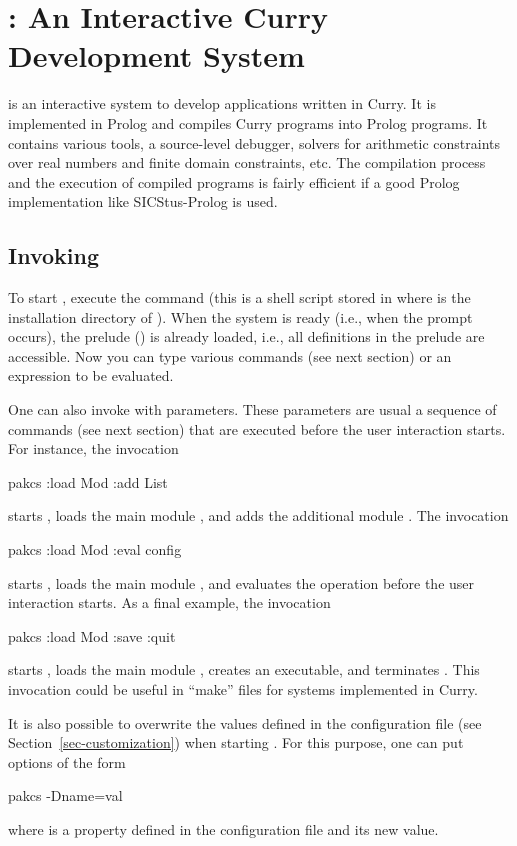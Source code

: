\section{\CYS: An Interactive Curry Development System}
\label{sec-curry2prolog}

\CYS\index{\CYS} is an interactive system to develop applications
written in Curry.
It is implemented in Prolog and compiles
Curry programs into Prolog programs. It contains various tools,
a source-level debugger,
solvers for arithmetic constraints over real numbers
and finite domain constraints, etc. The compilation process and the
execution of compiled programs is fairly efficient
if a good Prolog implementation like SICStus-Prolog is used.


\subsection{Invoking \CYS}
\label{sec:invoke-kics2}

To start \CYS, execute the command 
(this is a shell script stored in
 where \cyshome is the installation directory
of \CYS).
When the system is ready (i.e., when the prompt  occurs),
the prelude ()
is already loaded, i.e., all definitions in the prelude are accessible.
Now you can type various commands (see next section)
or an expression to be evaluated.

One can also invoke \CYS with parameters.
These parameters are usual a sequence of commands
(see next section) that are executed before the user interaction
starts. For instance, the invocation
\begin{curry}
pakcs :load Mod :add List
\end{curry}
starts \CYS, loads the main module , and adds the additional
module .
The invocation
\begin{curry}
pakcs :load Mod :eval config
\end{curry}
starts \CYS, loads the main module , and evaluates
the operation  before the user interaction starts.
As a final example, the invocation
\begin{curry}
pakcs :load Mod :save :quit
\end{curry}
starts \CYS, loads the main module , creates an executable,
and terminates \CYS. This invocation could be useful in ``make'' files
for systems implemented in Curry.

It is also possible to overwrite the values defined in the
configuration file 
(see Section~\ref{sec-customization})
when starting \CYS. For this purpose, one can put options of the form
\begin{curry}
pakcs -Dname=val
\end{curry}
where  is a property defined in the configuration file
and  its new value.



